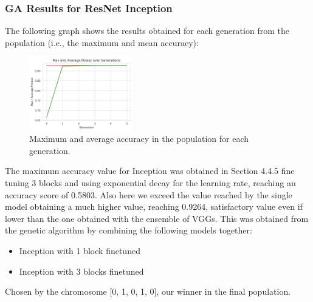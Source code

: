 \subsubsection{GA Results for ResNet Inception}
The following graph shows the results obtained for each generation from the population (i.e., the maximum and mean accuracy):

\begin{figure}[H]
	\centering
	\includegraphics[width=0.4\textwidth]{img/ensemble/inception.png}
	\caption{Maximum and average accuracy in the population for each generation.}
	\label{fig:ensembleinception}
\end{figure}

The maximum accuracy value for Inception was obtained in Section 4.4.5 fine tuning 3 blocks and using exponential decay for the learning rate, reaching an accuracy score of 0.5803. Also here we exceed the value reached by the single model obtaining a much higher value, reaching 0.9264, satisfactory value even if lower than the one obtained with the ensemble of VGGs. This was obtained from the genetic algorithm by combining the following models together:
 \begin{itemize}
	\item Inception with 1 block finetuned
	\item Inception with 3 blocks finetuned
\end{itemize}
Chosen by the chromosome [0, 1, 0, 1, 0], our winner in the final population.

